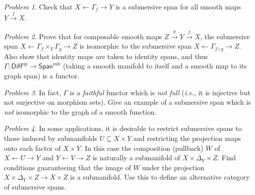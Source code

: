 \documentclass[11pt,twoside]{amsart}
\theoremstyle{plain}
\theoremstyle{remark}
\newtheorem{prob}{Problem}
\theoremstyle{definition}
\theoremstyle{definition}
\newcommand{\subspan}{\mathsf{Span}^{\mathrm{sub}}}
\newcommand{\Diff}{\mathsf{Diff}}
\newcommand{\op}{{\mathrm{op}}}
\begin{document}
\begin{prob}
Check that $X\leftarrow \Gamma_f\to Y$ is a submersive span for all smooth maps $Y\xrightarrow f X$.
\end{prob}

\begin{prob}
Prove that for composable smooth maps $Z\xrightarrow g Y\xrightarrow f X$, the submersive span $X\leftarrow \Gamma_f\times_Y\Gamma_g\to Z$ is isomorphic to the submersive span $X\leftarrow \Gamma_{f\circ g}\to Z$. Also show that identity maps are taken to identity spans, and thus $\Gamma\colon \Diff^\op\to \subspan$ (taking a smooth manifold to itself and a smooth map to its graph span) is a functor.
\end{prob}

\begin{prob}
In fact, $\Gamma$ is a \emph{faithful} functor which is \emph{not full} (\emph{i.e.}, it is injective but not surjective on morphism sets). Give an example of a submersive span which is \emph{not} isomorphic to the graph of a smooth function.
\end{prob}

\begin{prob}
In some applications, it is desirable to restrict submersive spans to those induced by submanifolds $U\subseteq X\times Y$ and restricting the projection maps onto each factor of $X\times Y$. In this case the composition (pullback) $W$ of $X\leftarrow U\to Y$ and $Y\leftarrow V\to Z$ is naturally a submanifold of $X\times \Delta_Y\times Z$. Find conditions guaranteeing that the image of $W$ under the projection $X\times \Delta_Y\times Z\to X\times Z$ is a submanifold. Use this to define an alternative category of submersive spans.
\end{prob}
\end{document}
